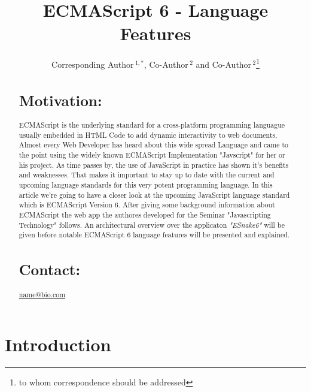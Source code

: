 \documentclass{bioinfo}
\begin{document}

\title[short Title]{ECMAScript 6 - Language Features}
\author[Sample \textit{et~al}]{Corresponding Author\,$^{1,*}$, Co-Author\,$^{2}$ and Co-Author\,$^2$\footnote{to whom correspondence should be addressed}}
\address{$^{1}$Department of XXXXXXX, Address XXXX etc.\\
$^{2}$Department of XXXXXXXX, Address XXXX etc.}



\maketitle

\begin{abstract}

\section{Motivation:}
ECMAScript is the underlying standard for a cross-platform programming languague usually embedded in HTML Code to add dynamic interactivity to web documents. 
Almost every Web Developer has heard about this wide spread Language and came to the point using the widely known ECMAScript Implementation "Javscript" for her or his project. 
As time passes by, the use of JavaScript in practice has shown it's benefits and weaknesses.
That makes it important to stay up to date with the current and upcoming language standards for this very potent programming language.  
In this article we're going to have a closer look at the upcoming JavaScript language standard which is ECMAScript Version 6.
After giving some background information about ECMAScript the web app the authores developed for the Seminar "Javascripting Technology" follows. 
An architectural overview over the applicaton \textit{"ESnake6"} will be given before notable ECMAScript 6 language features will be presented
and explained. 

\section{Contact:} \href{name@bio.com}{name@bio.com}
\end{abstract}
\section{Introduction}
\end{document}
